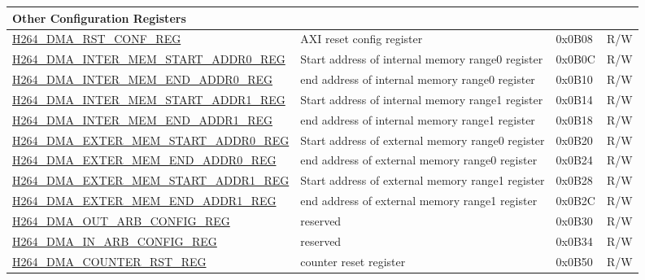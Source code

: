 \begin{longtable}{ | p{7.5cm} | p{5.7cm} | p{1.2cm} | p{1.5cm} | }
\multicolumn{4}{|l|}{\textbf{Other Configuration Registers}} \\ \hline
\hyperref[regdesc:H264DMARSTCONFREG]{H264\_DMA\_RST\_CONF\_REG} & AXI reset config register & 0x0B08 & R/W \\ \hline
\hyperref[regdesc:H264DMAINTERMEMSTARTADDR0REG]{H264\_DMA\_INTER\_MEM\_START\_ADDR0\_REG} & Start address of internal memory range0 register & 0x0B0C & R/W \\ \hline
\hyperref[regdesc:H264DMAINTERMEMENDADDR0REG]{H264\_DMA\_INTER\_MEM\_END\_ADDR0\_REG} & end address of internal memory range0 register & 0x0B10 & R/W \\ \hline
\hyperref[regdesc:H264DMAINTERMEMSTARTADDR1REG]{H264\_DMA\_INTER\_MEM\_START\_ADDR1\_REG} & Start address of internal memory range1 register & 0x0B14 & R/W \\ \hline
\hyperref[regdesc:H264DMAINTERMEMENDADDR1REG]{H264\_DMA\_INTER\_MEM\_END\_ADDR1\_REG} & end address of internal memory range1 register & 0x0B18 & R/W \\ \hline
\hyperref[regdesc:H264DMAEXTERMEMSTARTADDR0REG]{H264\_DMA\_EXTER\_MEM\_START\_ADDR0\_REG} & Start address of external memory range0 register & 0x0B20 & R/W \\ \hline
\hyperref[regdesc:H264DMAEXTERMEMENDADDR0REG]{H264\_DMA\_EXTER\_MEM\_END\_ADDR0\_REG} & end address of external memory range0 register & 0x0B24 & R/W \\ \hline
\hyperref[regdesc:H264DMAEXTERMEMSTARTADDR1REG]{H264\_DMA\_EXTER\_MEM\_START\_ADDR1\_REG} & Start address of external memory range1 register & 0x0B28 & R/W \\ \hline
\hyperref[regdesc:H264DMAEXTERMEMENDADDR1REG]{H264\_DMA\_EXTER\_MEM\_END\_ADDR1\_REG} & end address of external memory range1 register & 0x0B2C & R/W \\ \hline
\hyperref[regdesc:H264DMAOUTARBCONFIGREG]{H264\_DMA\_OUT\_ARB\_CONFIG\_REG} & reserved & 0x0B30 & R/W \\ \hline
\hyperref[regdesc:H264DMAINARBCONFIGREG]{H264\_DMA\_IN\_ARB\_CONFIG\_REG} & reserved & 0x0B34 & R/W \\ \hline
\hyperref[regdesc:H264DMACOUNTERRSTREG]{H264\_DMA\_COUNTER\_RST\_REG} & counter reset register & 0x0B50 & R/W \\ \hline


\end{longtable}
